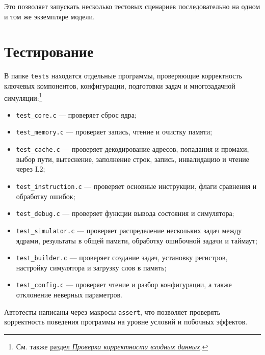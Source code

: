\documentclass[12pt,a4paper]{article}
\begin{document}
Это позволяет запускать несколько тестовых сценариев последовательно на одном и том же экземпляре модели.

\section{Тестирование}\label{sec:testing}

В папке \texttt{tests} находятся отдельные программы, проверяющие корректность ключевых компонентов, конфигурации, подготовки задач и многозадачной симуляции:\footnote{См. также \hyperref[sec:validation]{раздел \textit{Проверка корректности входных данных}}.}

\begin{itemize}[leftmargin=1.5em]
    \item \texttt{test\_core.c} --- проверяет сброс ядра;
    \item \texttt{test\_memory.c} --- проверяет запись, чтение и очистку памяти;
    \item \texttt{test\_cache.c} --- проверяет декодирование адресов, попадания и промахи, выбор пути, вытеснение, заполнение строк, запись, инвалидацию и чтение через L2;
    \item \texttt{test\_instruction.c} --- проверяет основные инструкции, флаги сравнения и обработку ошибок;
    \item \texttt{test\_debug.c} --- проверяет функции вывода состояния и симулятора;
    \item \texttt{test\_simulator.c} --- проверяет распределение нескольких задач между ядрами, результаты в общей памяти, обработку ошибочной задачи и таймаут;
    \item \texttt{test\_builder.c} --- проверяет создание задач, установку регистров, настройку симулятора и загрузку слов в память;
    \item \texttt{test\_config.c} --- проверяет чтение и разбор конфигурации, а также отклонение неверных параметров.
\end{itemize}

Автотесты написаны через макросы \texttt{assert}, что позволяет проверять корректность поведения программы на уровне условий и побочных эффектов.
\end{document}
